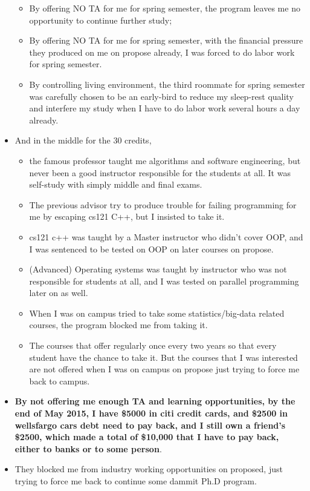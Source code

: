 \documentclass[9pt,b5paper]{article}
\begin{document}
\begin{itemize}
\begin{itemize}
\item By offering NO TA for me for spring semester, the program leaves me no opportunity to continue further study;
\item By offering NO TA for me for spring semester, with the financial pressure they produced on me on propose already, I was forced to do labor work for spring semester.
\item By controlling living environment, the third roommate for spring semester was carefully chosen to be an early-bird to reduce my sleep-rest quality and interfere my study when I have to do labor work several hours a day already.
\end{itemize}
\item And in the middle for the 30 credits, 
\begin{itemize}
\item the famous professor taught me algorithms and software engineering, but never been a good instructor responsible for the students at all. It was self-study with simply middle and final exams.
\item The previous advisor try to produce trouble for failing programming for me by escaping cs121 C++, but I insisted to take it.
\item cs121 c++ was taught by a Master instructor who didn't cover OOP, and I was sentenced to be tested on OOP on later courses on propose.
\item (Advanced) Operating systems was taught by instructor who was not responsible for students at all, and I was tested on parallel programming later on as well.
\item When I was on campus tried to take some statistics/big-data related courses, the program blocked me from taking it.
\item The courses that offer regularly once every two years so that every student have the chance to take it. But the courses that I was interested are not offered when I was on campus on propose just trying to force me back to campus.
\end{itemize}
\item \textbf{By not offering me enough TA and learning opportunities, by the end of May 2015, I have \$5000 in citi credit cards, and \$2500 in wellsfargo cars debt need to pay back, and I still own a friend's \$2500, which made a total of \$10,000 that I have to pay back, either to banks or to some person}.
\item They blocked me from industry working opportunities on proposed, just trying to force me back to continue some dammit Ph.D program. 

\end{itemize}
\end{document}
